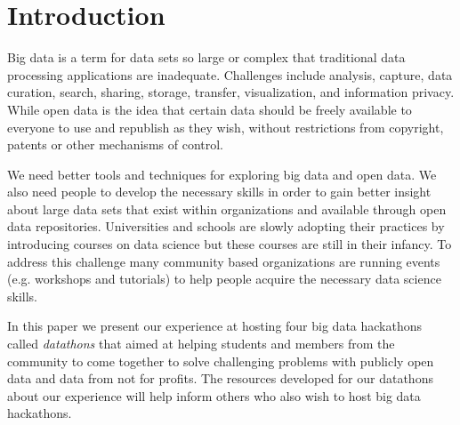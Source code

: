 \section{Introduction}

Big data is a term for data sets so large or complex that traditional data processing applications are inadequate. Challenges include analysis, capture, data curation, search, sharing, storage, transfer, visualization, and information privacy. While open data is the idea that certain data should be freely available to everyone to use and republish as they wish, without restrictions from copyright, patents or other mechanisms of control. 


We need better tools and techniques for exploring big data and open data. We also need people to develop the necessary skills in order to gain better insight about large data sets that exist within organizations and available through open data repositories. Universities and schools are slowly adopting their practices by introducing courses on data science but these courses are still in their infancy. To address this challenge many community based organizations are running events (e.g. workshops and tutorials) to help people acquire the necessary data science skills.

In this paper we present our experience at hosting four big data hackathons called \emph{datathons} that aimed at helping students and members from the community to come together to solve challenging problems with publicly open data and data from not for profits. The resources developed for our datathons about our experience will help inform others who also wish to host big data hackathons.


